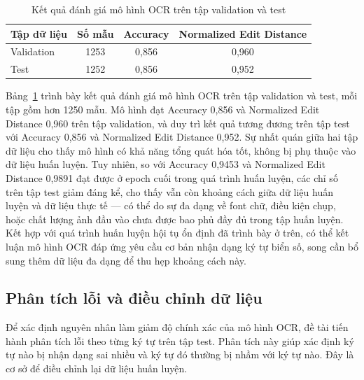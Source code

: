 \documentclass[13pt,a4paper]{report}
\begin{document}
\begin{table}[H]
	\centering
	\caption{Kết quả đánh giá mô hình OCR trên tập validation và test}
	\label{tab:ocr_eval_results}
	\renewcommand{\arraystretch}{1.4}
	\begin{tabular}{|p{4cm}|c|c|c|}
		\hline
		\textbf{Tập dữ liệu} & \textbf{Số mẫu} & \textbf{Accuracy} & \textbf{Normalized Edit Distance} \\
		\hline
		Validation & 1253 & 0,856 & 0,960 \\
		\hline
		Test & 1252 & 0,856 & 0,952 \\
		\hline
	\end{tabular}
\end{table}



Bảng~\ref{tab:ocr_eval_results} trình bày kết quả đánh giá mô hình OCR trên tập 
validation và test, mỗi tập gồm hơn 1250 mẫu. Mô hình đạt Accuracy 0,856 
và Normalized Edit Distance 0,960 trên tập validation, và duy trì kết quả 
tương đương trên tập test với Accuracy 0,856 và Normalized Edit Distance 
0,952. Sự nhất quán giữa hai tập dữ liệu cho thấy mô hình có khả năng tổng 
quát hóa tốt, không bị phụ thuộc vào dữ liệu huấn luyện. Tuy nhiên, so với 
Accuracy 0,9453 và Normalized Edit Distance 0,9891 đạt được ở epoch cuối 
trong quá trình huấn luyện, các chỉ số trên tập test giảm đáng kể, cho thấy 
vẫn còn khoảng cách giữa dữ liệu huấn luyện và dữ liệu thực tế — có thể do 
sự đa dạng về font chữ, điều kiện chụp, hoặc chất lượng ảnh đầu vào chưa 
được bao phủ đầy đủ trong tập huấn luyện. Kết hợp với quá trình huấn luyện 
hội tụ ổn định đã trình bày ở trên, có thể kết luận mô hình OCR đáp ứng yêu 
cầu cơ bản nhận dạng ký tự biển số, song cần bổ sung thêm dữ liệu đa dạng để 
thu hẹp khoảng cách này.



\subsection{Phân tích lỗi và điều chỉnh dữ liệu}

Để xác định nguyên nhân làm giảm độ chính xác của mô hình OCR, đề tài tiến hành phân tích lỗi theo từng ký tự trên tập test. Phân tích này giúp xác định ký tự nào bị nhận dạng sai nhiều và ký tự đó thường bị nhầm với ký tự nào. Đây là cơ sở để điều chỉnh lại dữ liệu huấn luyện.
\end{document}
